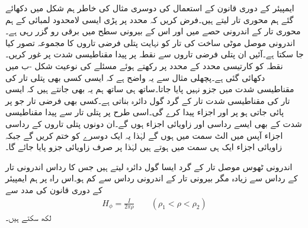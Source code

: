 ایمپیئر کے دوری قانون  کے استعمال کی دوسری مثال کی خاطر ہم شکل  میں دکھائے گئے ہم محوری تار لیتے ہیں۔فرض کریں کہ  محدد پر پڑی  ایسی لامحدود لمبائی کے ہم محوری  تار کے اندرونی حصے میں  اور اس کے بیرونی سطح میں  برقی رو گزر رہی ہے۔اندرونی موصل موٹی ساخت کی تار کو نہایت پتلی فرضی تاروں کا مجموعہ تصور کیا جا سکتا ہے۔آئیں ان پتلی فرضی تاروں سے نقطہ  پر پیدا مقناطیسی شدت پر غور کریں۔نقطہ  کو کارتیسی محدد کے  محدد پر رکھتے ہوئے مسئلے کی نوعیت شکل -ب میں دکھائی گئی ہے۔پچھلی مثال سے یہ واضح ہے کہ ایسی کسی بھی پتلی تار کی مقناطیسی شدت میں  جزو نہیں پایا جاتا۔ساتھ ہی ساتھ ہم یہ بھی جانتے ہیں کہ ایسی تار کی مقناطیسی شدت تار کے گرد گول دائرہ بناتی ہے۔کسی بھی فرضی تار جو  پر پائی جاتی ہو  پر   اور  اجزاء پیدا کرے گی۔اسی طرح  پر پتلی تار سے پیدا مقناطیسی شدت کے بھی ایسے رداسی اور زاویائی اجزاء ہوں گے۔ان دونوں پتلی تاروں کے رداسی اجزاء آپس میں الٹ سمت میں ہوں گے لہٰذا یہ ایک دوسرے کو ختم کریں گے جبکہ زاویائی اجزاء ایک ہی سمت میں ہوتے ہیں لہٰذا  پر صرف زاویائی جزو پایا جائے گا۔

اندرونی ٹھوس موصل تار کے گرد ایسا گول دائرہ لیتے ہیں جس کا رداس  اندرونی تار کے رداس  سے زیادہ مگر بیرونی تار کے اندرونی رداس  سے کم ہو۔اس راہ پر ہم ایمپیئر کے دوری قانون کی مدد سے
\begin{align}\label{مساوات_مقناطیسی_ہم_محوری_تاروں_کے_درمیان_شدت}
H_{\phi}=\frac{I}{2\pi \rho} \quad \quad (\rho_1 < \rho <\rho_2)
\end{align}
لکھ سکتے ہیں۔

